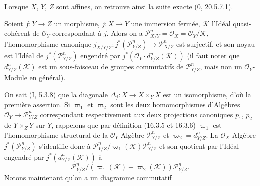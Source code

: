 Lorsque $X$, $Y$, $Z$ sont affines, on retrouve ainsi la suite exacte
(0, 20.5.7.1).

\begin{proposition}[16.4.20]
\label{IV.16.4.20}
Soient $f:Y\to Z$ un morphisme, $j:X\to Y$ une immersion fermée,
$\mathscr{K}$ l'Idéal quasi-cohérent de $\mathcal{O}_Y$ correspondant à $j$.
Alors on a
$\mathscr{P}_{X/Y}^n=\mathcal{O}_X=\mathcal{O}_Y/\mathscr{K}$,
l'homomorphisme canonique
$j_{X/Y/Z}:j^*(\mathscr{P}_{Y/Z}^n)\to\mathscr{P}_{X/Z}^n$ est surjectif, et
son noyau est l'Idéal de $j^*(\mathscr{P}_{Y/Z}^n)$ engendré par
$j^*(\mathcal{O}_Y\cdot d_{Y/Z}^n(\mathscr{K}))$ (il faut noter que
$d_{Y/Z}^n(\mathscr{K})$ est un sous-faisceau de groupes commutatifs de
$\mathscr{P}_{Y/Z}^n$, mais non un $\mathcal{O}_Y$-Module en général).
\end{proposition}

On sait (I, 5.3.8) que la diagonale
$\Delta_j:X\to X\times_Y X$ est un isomorphisme, d'où la première assertion.
Si $\varpi_1$ et $\varpi_2$ sont les deux homomorphismes d'Algèbres
$\mathcal{O}_Y\to\mathscr{P}_{Y/Z}^n$ correspondant respectivement aux deux
projections canoniques $p_1$, $p_2$ de $Y\times_Z Y$ sur $Y$, rappelons que
par définition (16.3.5 et 16.3.6) $\varpi_1$ est l'homomorphisme structural de
la $\mathcal{O}_Y$-Algèbre $\mathscr{P}_{Y/Z}^n$ et
$\varpi_2=d_{Y/Z}^n$. La $\mathcal{O}_X$-Algèbre
$j^*(\mathscr{P}_{Y/Z}^n)$ s'identifie donc à
$\mathscr{P}_{Y/Z}^n/\varpi_1(\mathscr{K})\mathscr{P}_{Y/Z}^n$ et son quotient
par l'Idéal engendré par $j^*(d_{Y/Z}^n(\mathscr{K}))$ à
\[
  \mathscr{P}_{Y/Z}^n/
  (\varpi_1(\mathscr{K})+\varpi_2(\mathscr{K}))\mathscr{P}_{Y/Z}^n.
\]
Notons maintenant qu'on a un diagramme commutatif
